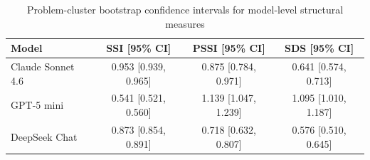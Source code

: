 \begin{table}[t]
\centering
\caption{Problem-cluster bootstrap confidence intervals for model-level structural measures}
\label{tab:model_bootstrap_ci}
\begin{tabular}{lccc}
\toprule
Model & SSI [95\% CI] & PSSI [95\% CI] & SDS [95\% CI] \\
\midrule
Claude Sonnet 4.6 & 0.953 [0.939, 0.965] & 0.875 [0.784, 0.971] & 0.641 [0.574, 0.713] \\
GPT-5 mini & 0.541 [0.521, 0.560] & 1.139 [1.047, 1.239] & 1.095 [1.010, 1.187] \\
DeepSeek Chat & 0.873 [0.854, 0.891] & 0.718 [0.632, 0.807] & 0.576 [0.510, 0.645] \\
\bottomrule
\end{tabular}
\end{table}
